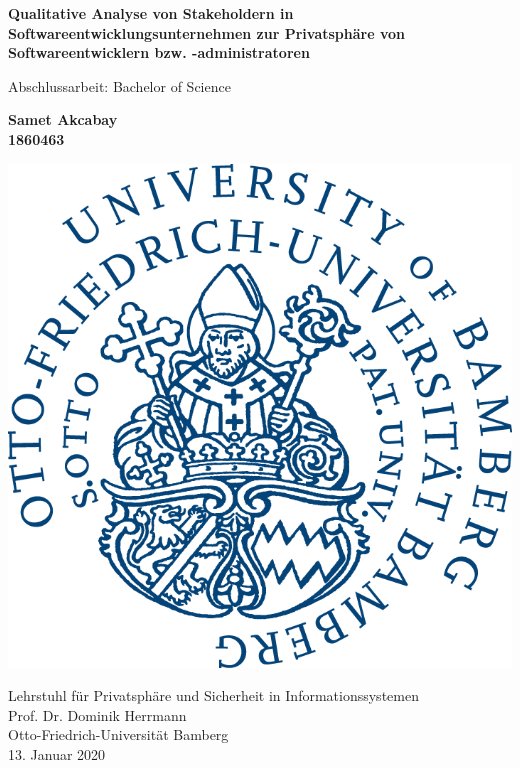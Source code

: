 \documentclass[11pt]{article}
\begin{document}
	\begin{titlepage}
		\begin{center}
			\vspace*{1cm}
			
			\Huge
			\textbf{Qualitative Analyse von Stakeholdern in Softwareentwicklungsunternehmen zur Privatsphäre von Softwareentwicklern bzw. -administratoren}
			
			\vspace{0.5cm}
			
			\LARGE
			Abschlussarbeit: Bachelor of Science
			
			\vspace{1.5cm}
			
			\Large
			\textbf{Samet Akcabay\\1860463}
			
			\vspace{0.8cm}
			
			\includegraphics[scale=0.75]{img/logo.png}
			
			\vspace{0.8cm}
			
			\Large
			Lehrstuhl für Privatsphäre und Sicherheit in Informationssystemen\\
			Prof. Dr. Dominik Herrmann\\
			Otto-Friedrich-Universität Bamberg\\
			13. Januar 2020		
				
		\end{center}
	\end{titlepage}
\end{document}
